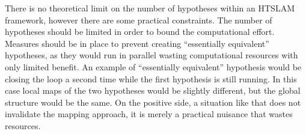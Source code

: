 There is no theoretical limit on the number of hypotheses within an
HTSLAM framework, however there are some practical constraints.  The
number of hypotheses should be limited in order to bound the
computational effort. Measures should be in place to prevent creating
``essentially equivalent'' hypotheses, as they would run in parallel
wasting computational resources with only limited benefit. An example of
``essentially equivalent'' hypothesis would be closing the loop a second
time while the first hypothesis is still running. In this case local
maps of the two hypotheses would be slightly different, but the global
structure would be the same. On the positive side, a situation like
that does not invalidate the mapping approach, it is merely a
practical nuisance that wastes resources.


